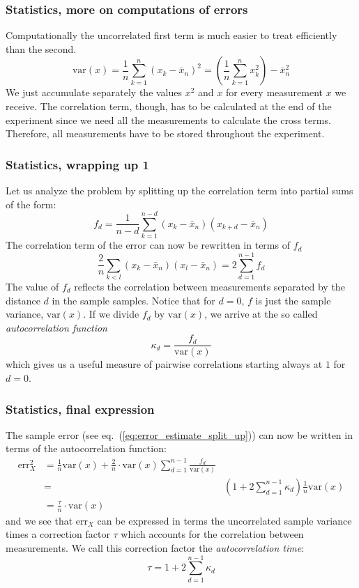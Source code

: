 \documentclass{beamer}
\begin{document}
\begin{frame}
\frametitle{Statistics, more on computations of errors}

\begin{block}{}
Computationally the uncorrelated first term is much easier to treat
efficiently than the second.
\[
\mathrm{var}(x) = \frac{1}{n}\sum_{k=1}^n (x_k - \bar x_n)^2 =
\left(\frac{1}{n}\sum_{k=1}^n x_k^2\right) - \bar x_n^2
\]
We just accumulate separately the values $x^2$ and $x$ for every
measurement $x$ we receive. The correlation term, though, has to be
calculated at the end of the experiment since we need all the
measurements to calculate the cross terms. Therefore, all measurements
have to be stored throughout the experiment.
\end{block}
\end{frame}

\begin{frame}
\frametitle{Statistics, wrapping up 1}

\begin{block}{}
Let us analyze the problem by splitting up the correlation term into
partial sums of the form:
\[
f_d = \frac{1}{n-d}\sum_{k=1}^{n-d}(x_k - \bar x_n)(x_{k+d} - \bar x_n)
\]
The correlation term of the error can now be rewritten in terms of
$f_d$
\[
\frac{2}{n}\sum_{k<l} (x_k - \bar x_n)(x_l - \bar x_n) =
2\sum_{d=1}^{n-1} f_d
\]
The value of $f_d$ reflects the correlation between measurements
separated by the distance $d$ in the sample samples.  Notice that for
$d=0$, $f$ is just the sample variance, $\mathrm{var}(x)$. If we divide $f_d$
by $\mathrm{var}(x)$, we arrive at the so called \emph{autocorrelation function}
\[
\kappa_d = \frac{f_d}{\mathrm{var}(x)}
\]
which gives us a useful measure of pairwise correlations
starting always at $1$ for $d=0$.
\end{block}
\end{frame}

\begin{frame}
\frametitle{Statistics, final expression}

\begin{block}{}
The sample error (see eq.~(\ref{eq:error_estimate_split_up})) can now be
written in terms of the autocorrelation function:
\begin{align}
\mathrm{err}_X^2 &=
\frac{1}{n}\mathrm{var}(x)+\frac{2}{n}\cdot\mathrm{var}(x)\sum_{d=1}^{n-1}
\frac{f_d}{\mathrm{var}(x)}\nonumber\\ &=&
\left(1+2\sum_{d=1}^{n-1}\kappa_d\right)\frac{1}{n}\mathrm{var}(x)\nonumber\\
&=\frac{\tau}{n}\cdot\mathrm{var}(x)
\label{eq:error_estimate_corr_time}
\end{align}
and we see that $\mathrm{err}_X$ can be expressed in terms the
uncorrelated sample variance times a correction factor $\tau$ which
accounts for the correlation between measurements. We call this
correction factor the \emph{autocorrelation time}:
\begin{equation}
\tau = 1+2\sum_{d=1}^{n-1}\kappa_d
\label{eq:autocorrelation_time}
\end{equation}
\end{block}
\end{frame}
\end{document}
